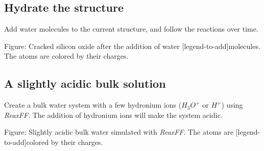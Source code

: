 \subsection{Hydrate the structure}
\noindent Add water molecules to the current structure, and follow the reactions over
time.

\vspace{0.25cm} Figure: Cracked silicon oxide after the addition of water
[legend-to-add]molecules. The atoms are colored by their charges.

\subsection{A slightly acidic bulk solution}
\noindent Create a bulk water system with a few hydronium ions ($H_3O^+$
or $H^+$) using \textit{ReaxFF}. The addition of hydronium ions will make the
system acidic.

\vspace{0.25cm} Figure: Slightly acidic bulk water simulated with \textit{ReaxFF}. The atoms are
[legend-to-add]colored by their charges.

